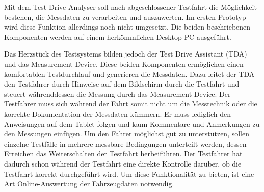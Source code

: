 \documentclass[12pt,a4paper]{report}
\begin{document}
Mit dem Test Drive Analyser soll nach abgeschlossener Testfahrt die Möglichkeit bestehen, die Messdaten zu verarbeiten und auszuwerten. Im ersten Prototyp wird diese Funktion allerdings noch nicht umgesetzt. Die beiden beschriebenen Komponenten werden auf einem herkömmlichen Desktop PC ausgeführt.

Das Herzstück des Testsystems bilden jedoch der Test Drive Assistant (TDA) und das Measurement Device. Diese beiden Komponenten ermöglichen einen komfortablen Testdurchlauf und generieren die Messdaten. Dazu leitet der TDA den Testfahrer durch Hinweise auf dem Bildschirm durch die Testfahrt und steuert währenddessen die Messung durch das Measurement Device. Der Testfahrer muss sich während der Fahrt somit nicht um die Messtechnik oder die korrekte Dokumentation der Messdaten kümmern. Er muss lediglich den Anweisungen auf dem Tablet folgen und kann Kommentare und Anmerkungen zu den Messungen einfügen. Um den Fahrer möglichst gut zu unterstützen, sollen einzelne Testfälle in mehrere messbare Bedingungen unterteilt werden, dessen Erreichen das Weiterschalten der Testfahrt herbeiführen. Der Testfahrer hat dadurch schon während der Testfahrt eine direkte Kontrolle darüber, ob die Testfahrt korrekt durchgeführt wird. Um diese Funktionalität zu bieten, ist eine Art Online-Auswertung der Fahrzeugdaten notwendig.
\end{document}
